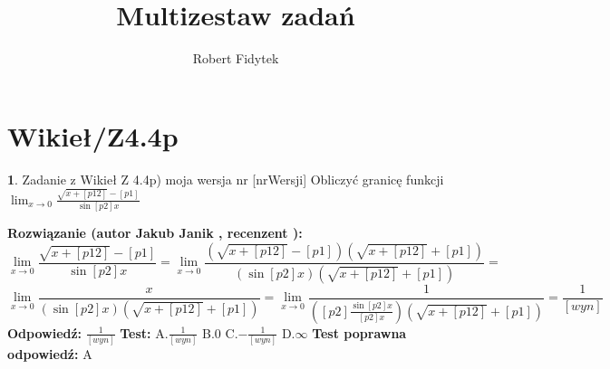 \documentclass[12pt, a4paper]{article}
\title{Multizestaw zadań}
\author{Robert Fidytek}
\date{}
\theoremstyle{definition} %
\newtheorem{zad}{}
\newcommand{\kategoria}[1]{\section{#1}} %
\newcommand{\zadStart}[1]{\begin{zad}#1\newline} %
\newcommand{\zadStop}{\end{zad}}   %
\newcommand{\rozwStart}[2]{\noindent \textbf{Rozwiązanie (autor #1 , recenzent #2): }\newline} %
\newcommand{\rozwStop}{\newline}                                            %
\newcommand{\odpStart}{\noindent \textbf{Odpowiedź:}\newline}    %
\newcommand{\odpStop}{\newline}                                             %
\newcommand{\testStart}{\noindent \textbf{Test:}\newline} %
\newcommand{\testStop}{\newline} %
\newcommand{\kluczStart}{\noindent \textbf{Test poprawna odpowiedź:}\newline} %
\newcommand{\kluczStop}{\newline} %
\begin{document}
\maketitle


\kategoria{Wikieł/Z4.4p}
\zadStart{Zadanie z Wikieł Z 4.4p) moja wersja nr [nrWersji]}
Obliczyć granicę funkcji $\lim_{x \to 0} \frac{\sqrt{x+[p12]}-[p1]}{\sin{[p2]x}}$
\zadStop
\rozwStart{Jakub Janik}{}
$$\lim_{x \to 0} \frac{\sqrt{x+[p12]}-[p1]}{\sin{[p2]x}}=\lim_{x \to 0} \frac{(\sqrt{x+[p12]}-[p1])(\sqrt{x+[p12]}+[p1])}{(\sin{[p2]x})(\sqrt{x+[p12]}+[p1])}=$$
$$\lim_{x \to 0} \frac{x}{(\sin{[p2]x})(\sqrt{x+[p12]}+[p1])}=\lim_{x \to 0} \frac{1}{([p2]\frac{\sin{[p2]x}}{[p2]x})(\sqrt{x+[p12]}+[p1])}=\frac{1}{[wyn]}$$
\rozwStop
\odpStart
$\frac{1}{[wyn]}$
\odpStop
\testStart
A.$\frac{1}{[wyn]}$
B.$0$
C.$-\frac{1}{[wyn]}$
D.$\infty$
\testStop
\kluczStart
A
\kluczStop
\end{document}
